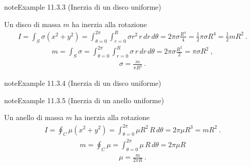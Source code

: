 \documentclass[letterpaper,10pt,italian]{jupyterBook}
\begin{document}
\begin{sphinxadmonition}{note}{Example 11.3.3 (Inerzia di un disco uniforme)}



\sphinxAtStartPar
Un disco di massa \(m\) ha inerzia alla rotazione
\begin{equation*}
\begin{split}I = \int_S \sigma \left( x^2 + y^2 \right) = \int_{\theta=0}^{2\pi} \int_{r=0}^{R} \sigma r^2 \, r \, dr \, d\theta = 2 \pi \sigma \frac{R^4}{4} = \frac{1}{2} \pi \sigma R^4 = \frac{1}{2} m R^2 \ . \end{split}
\end{equation*}\begin{equation*}
\begin{split}m = \int_S \sigma = \int_{\theta = 0}^{2 \pi} \int_{r=0}^{R} \sigma \, r \, dr \, d\theta = 2 \pi \sigma \frac{R^2}{2} = \pi \sigma R^2 \ ,\end{split}
\end{equation*}\begin{equation*}
\begin{split}\sigma = \frac{m}{\pi R^2} \ .\end{split}
\end{equation*}\end{sphinxadmonition}
\label{ch/mechanics/inertia-continuum:inertia-disk-non-uniform-non-symmetric}
\begin{sphinxadmonition}{note}{Example 11.3.4 (Inerzia di un disco uniforme)}


\end{sphinxadmonition}
\label{ch/mechanics/inertia-continuum:inertia-ring}
\begin{sphinxadmonition}{note}{Example 11.3.5 (Inerzia di un anello uniforme)}



\sphinxAtStartPar
Un anello di massa \(m\) ha inerzia alla rotazione
\begin{equation*}
\begin{split}I = \oint_C \mu \left( x^2 + y^2 \right) = \int_{\theta=0}^{2\pi}  \mu R^2 \, R \, d\theta = 2 \pi \mu R^3 = m R^2 \ . \end{split}
\end{equation*}\begin{equation*}
\begin{split}m = \oint_C \mu = \int_{\theta = 0}^{2 \pi} \mu \, R \, d\theta = 2 \pi \mu R \end{split}
\end{equation*}\begin{equation*}
\begin{split}\mu = \frac{m}{2 \pi R} \ .\end{split}
\end{equation*}\end{sphinxadmonition}
\end{document}
